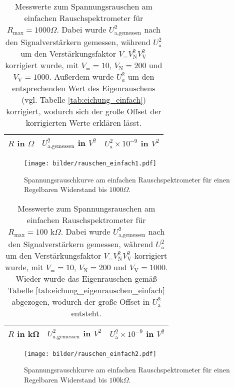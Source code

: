 \begin{table}[h]
			\centering
			\begin{tabular}{ccc}
				\toprule \midrule
				$R$ in $\Omega$ & $U_\text{a,gemessen}^2$ in $V^2$
				& $U_\text{a}^2 \times 10^{-9}$ in $V^2$ \\
				\midrule
				
				\midrule \bottomrule
			\end{tabular}
			\caption{Messwerte zum Spannungsrauschen am einfachen
			Rauschspektrometer für $R_\text{max}=1000 \Omega$.
			Dabei wurde $U_\text{a,gemessen}^2$ nach den Signalverstärkern gemessen, während
			$U_\text{a}^2$ um den Verstärkungsfaktor $V_= V_\text{N}^2 V_\text{V}^2$ korrigiert
			wurde, mit $V_=
			=10$, $V_\text{N}=200$ und $V_\text{V}=1000$. Außerdem wurde 
			$U^2_a$ um den entsprechenden Wert des Eigenrauschens (vgl. 
			Tabelle \ref{tab:eichung_einfach}) korrigiert, wodurch sich 
			der große Offset der korrigierten Werte erklären lässt.  
			}
			\label{tab:rauschen_einfach1}
\end{table}
\begin{figure}[h]
			\centering
			\texttt{[image: bilder/rauschen\_einfach1.pdf]}
			\caption{Spannungsrauschkurve am einfachen Rauschspektrometer für einen
			Regelbaren Widerstand bis $1000\Omega$.}
			\label{fig:rauschen_einfach1}
	\end{figure}




	\begin{table}[h]
			\centering
			\begin{tabular}{ccc}
				\toprule \midrule
				$R$ in \si{\kilo\ohm} & $U_\text{a,gemessen}^2$ in $V^2$
				& $U_\text{a}^2 \times 10^{-9}$ in $V^2$\\
				\midrule
				
				\midrule \bottomrule
			\end{tabular}
			\caption{Messwerte zum Spannungsrauschen am einfachen
			Rauschspektrometer für $R_\text{max}=100 \text{ k}\Omega$.
			Dabei wurde $U_\text{a,gemessen}^2$ nach den Signalverstärkern gemessen, während
			$U_\text{a}^2$ um den Verstärkungsfaktor $V_= V_\text{N}^2 V_\text{V}^2$ korrigiert
			wurde, mit $V_=
			=10$, $V_\text{N}=200$ und $V_\text{V}=1000$. Wieder wurde das 
			Eigenrauschen gemäß Tabelle \ref{tab:eichung_eigenrauschen_einfach} 
			abgezogen, wodurch der große Offset in $U_\text{a}^2$ entsteht. }
			\label{tab:rauschen_einfach2}
	\end{table}
	\begin{figure}[h]
			\centering
			\texttt{[image: bilder/rauschen\_einfach2.pdf]}
			\caption{Spannungsrauschkurve am einfachen Rauschspektrometer für einen
			Regelbaren Widerstand bis $100\text{k}\Omega$.}
			\label{fig:rauschen_einfach2}

	\end{figure}


